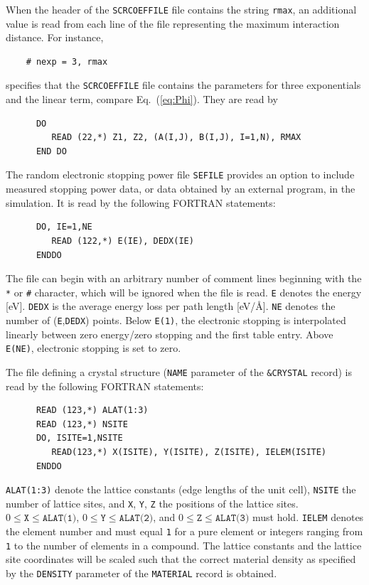 When the header of the \texttt{SCRCOEFFILE} file contains the string 
\texttt{rmax}, an additional value is read from each line of the file 
representing the maximum interaction distance. For instance, 
%
\begin{verbatim}
    # nexp = 3, rmax
\end{verbatim}
%
specifies that the \texttt{SCRCOEFFILE} file contains the parameters for three 
exponentials and the linear term, compare Eq.~(\ref{eq:Phi}). They are read
by
%
\begin{verbatim}
      DO
         READ (22,*) Z1, Z2, (A(I,J), B(I,J), I=1,N), RMAX
      END DO 
\end{verbatim}

The random electronic stopping power file \texttt{SEFILE} provides an option to
include measured stopping power data, or data obtained by an external program,
in the simulation. It is read by the following FORTRAN statements:
%
\begin{verbatim}
      DO, IE=1,NE
         READ (122,*) E(IE), DEDX(IE)
      ENDDO
\end{verbatim}
%
The file can begin with an arbitrary number of comment lines beginning with the
\texttt{*} or \texttt{\#} character, which will be ignored when the file is 
read. \texttt{E} denotes the energy [eV]. \texttt{DEDX} is the average energy 
loss per path length [eV/\AA]. \texttt{NE} denotes the number of 
(\texttt{E},\texttt{DEDX}) points. Below \texttt{E(1)}, the electronic stopping 
is interpolated linearly between zero energy/zero stopping and the first table
entry. Above \texttt{E(NE)}, electronic stopping is set to zero.

The file defining a crystal structure (\texttt{NAME} parameter of the
\texttt{\&CRYSTAL} record) is read by the following FORTRAN statements:
%
\begin{verbatim}
      READ (123,*) ALAT(1:3)
      READ (123,*) NSITE
      DO, ISITE=1,NSITE
         READ(123,*) X(ISITE), Y(ISITE), Z(ISITE), IELEM(ISITE)
      ENDDO
\end{verbatim}
%
\texttt{ALAT(1:3)} denote the lattice constants (edge lengths of the unit
cell), \texttt{NSITE} the number of lattice sites, and \texttt{X}, \texttt{Y},
\texttt{Z} the positions of the lattice sites. $0 \le \texttt{X} \le
\texttt{ALAT(1)}$, $0 \le \texttt{Y} \le \texttt{ALAT(2)}$, and $0 \le
\texttt{Z} \le \texttt{ALAT(3)}$ must hold.  \texttt{IELEM} denotes the element
number and must equal \texttt{1} for a pure  element or integers ranging from
\texttt{1} to the number of elements in a  compound. The lattice constants and
the lattice site coordinates  will be scaled such that the correct material
density as specified by the \texttt{DENSITY} parameter of the \texttt{MATERIAL}
record is obtained.

